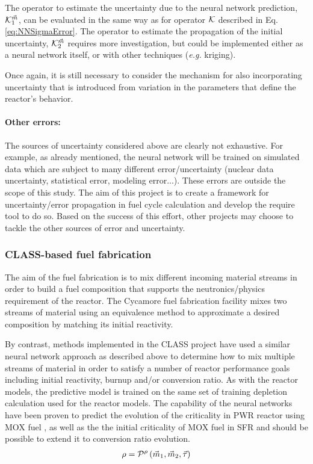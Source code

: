 \documentclass[dvips,12pt]{article}
\begin{document}
The operator to estimate the uncertainty due to
the neural network prediction, ${\cal
  K}_1^{{\vec{m}}}$, can be evaluated in the same way
as for operator ${\cal K}$ described in
Eq.\eqref{eq:NNSigmaError}. The operator to estimate
the propagation of the initial uncertainty,
${\cal K}_2^{{\vec{m}}}$ requires more investigation,
but could be implemented either as a neural
network itself, or with other techniques
(\textit{e.g.} kriging).

Once again, it is still necessary to consider the
mechanism for also incorporating uncertainty that
is introduced from variation in the parameters
that define the reactor's behavior.

\paragraph{Other errors:\\}

The sources of uncertainty considered above are
clearly not exhaustive. For example, as already
mentioned, the neural network will be trained on
simulated data which are subject to many different
error/uncertainty (nuclear data uncertainty,
statistical error, modeling error...).  These
errors are outside the scope of this study.  The
aim of this project is to create a framework for
uncertainty/error propagation in fuel cycle
calculation and develop the require tool to do so.
Based on the success of this effort, other
projects may choose to tackle the other sources of
error and uncertainty.

\subsubsection{CLASS-based fuel fabrication} \label{sec:fabrication}

The aim of the fuel fabrication is to mix
different incoming material streams in order to
build a fuel composition that supports the
neutronics/physics requirement of the reactor. The
Cycamore fuel fabrication facility mixes two
streams of material using an equivalence method to
approximate a desired composition by matching its
initial reactivity.  \cite{cycamore_fab}

By contrast, methods implemented in the CLASS
project have used a similar neural network
approach as described above to determine how to
mix multiple streams of material in order to
satisfy a number of reactor performance goals
including initial reactivity, burnup and/or
conversion ratio. As with the reactor models, the
predictive model is trained on the same set of
training depletion calculation used for the
reactor models. The capability of the neural
networks have been proven to predict the evolution
of the criticality in PWR reactor using MOX fuel
\cite{Leniau.ANE.2015}, as well as
the the initial criticality of MOX fuel in SFR
\cite{CLASS_UserGuide} and should be possible to
extend it to conversion ratio evolution.
\begin{align}
  \rho = {\cal P}^{\rho}\left( \vec{m}_{1},\vec{m}_{2}, \vec{\tau} \right)
\end{align}
\end{document}
